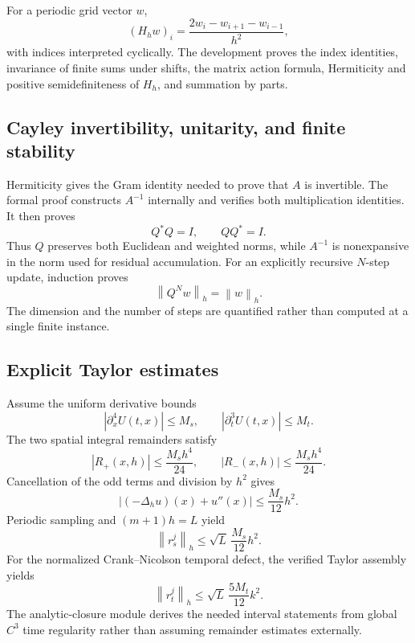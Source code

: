 \documentclass[11pt]{article}
\newcommand{\normh}[1]{\left\lVert#1\right\rVert_h}
\begin{document}
For a periodic grid vector $w$,
\[
 (H_hw)_i=\frac{2w_i-w_{i+1}-w_{i-1}}{h^2},
\]
with indices interpreted cyclically.  The development proves the index
identities, invariance of finite sums under shifts, the matrix action formula,
Hermiticity and positive semidefiniteness of $H_h$, and summation by parts.

\subsection{Cayley invertibility, unitarity, and finite stability}

Hermiticity gives the Gram identity needed to prove that $A$ is invertible.
The formal proof constructs $A^{-1}$ internally and verifies both multiplication
identities.  It then proves
\[
 Q^*Q=I,\qquad QQ^*=I.
\]
Thus $Q$ preserves both Euclidean and weighted norms, while $A^{-1}$ is
nonexpansive in the norm used for residual accumulation.  For an explicitly
recursive $N$-step update, induction proves
\begin{equation}\label{eq:stability}
 \normh{Q^Nw}=\normh{w}.
\end{equation}
The dimension and the number of steps are quantified rather than computed at a
single finite instance.

\subsection{Explicit Taylor estimates}

Assume the uniform derivative bounds
\[
 |\partial_x^4U(t,x)|\le M_s,\qquad
 |\partial_t^3U(t,x)|\le M_t.
\]
The two spatial integral remainders satisfy
\[
 |R_+(x,h)|\le\frac{M_sh^4}{24},\qquad
 |R_-(x,h)|\le\frac{M_sh^4}{24}.
\]
Cancellation of the odd terms and division by $h^2$ gives
\begin{equation}\label{eq:space}
 \left|(-\Delta_hu)(x)+u''(x)\right|
 \le\frac{M_s}{12}h^2.
\end{equation}
Periodic sampling and $(m+1)h=L$ yield
\begin{equation}\label{eq:spaceweighted}
 \normh{r_s^j}\le\sqrt L\,\frac{M_s}{12}h^2.
\end{equation}
For the normalized Crank--Nicolson temporal defect, the verified Taylor
assembly yields
\begin{equation}\label{eq:time}
 \normh{r_t^j}\le\sqrt L\,\frac{5M_t}{12}k^2.
\end{equation}
The analytic-closure module derives the needed interval statements from global
$C^3$ time regularity rather than assuming remainder estimates externally.
\end{document}
